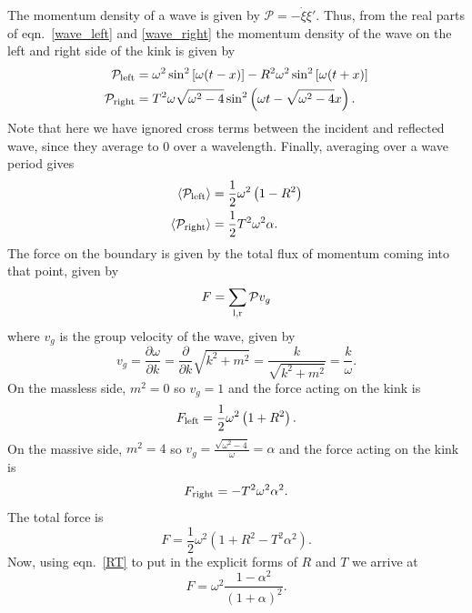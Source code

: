 \documentclass[11pt, oneside]{article}  	%
\numberwithin{equation}{section}
\begin{document}
The momentum density of a wave is given by $\mathcal{P} = -\dot{\xi}\xi'$. Thus, from the real parts of eqn.~\ref{wave_left} and \ref{wave_right} the momentum density of the wave on the left and right side of the kink is given by
\begin{align}
\mathcal{P}_\textup{left} &= \omega^2 \sin^2\left[\omega(t-x)\right] - R^2 \omega^2 \sin^2\left[\omega(t+x)\right]\\
\mathcal{P}_\textup{right} &= T^2 \omega \sqrt{\omega^2 - 4} \sin^2\left( \omega t - \sqrt{\omega^2 - 4} x\right ).
\end{align}
Note that here we have ignored cross terms between the incident and reflected wave, since they average to 0 over a wavelength. Finally, averaging over a wave period gives
\begin{align}
 \left \langle \mathcal{P}_\textup{left} \right \rangle &= \frac{1}{2}\omega^2 \left ( 1 - R^2 \right) \\
 \left \langle \mathcal{P}_\textup{right} \right \rangle &= \frac{1}{2}T^2 \omega^2 \alpha.
\end{align}
The force on the boundary is given by the total flux of momentum coming into that point, given by
\begin{equation}
F = \sum_\textup{l,r} \mathcal{P} v_g
\end{equation}
where $v_g$ is the group velocity of the wave, given by
\begin{equation}
v_g = \frac{\partial \omega}{\partial k} = \frac{\partial }{\partial k} \sqrt{k^2+m^2} = \frac{k}{\sqrt{k^2+m^2}} = \frac{k}{\omega}.
\end{equation}
On the massless side, $m^2 = 0$ so $v_g = 1$ and the force acting on the kink is
\begin{equation}
F_\textup{left} = \frac{1}{2}\omega^2 \left ( 1 + R^2 \right).
\end{equation}
On the massive side, $m^2 = 4$ so $v_g = \frac{\sqrt{\omega^2 - 4}}{\omega} = \alpha$ and the force acting on the kink is
\begin{equation}
F_\textup{right} = -T^2 \omega^2 \alpha^2.
\end{equation}
The total force is
\begin{equation}
F = \frac{1}{2}\omega^2 \left ( 1 + R^2-T^2\alpha^2\right).
\end{equation}
Now, using eqn.~\ref{RT} to put in the explicit forms of $R$ and $T$ we arrive at
\begin{equation}
F = \omega^2 \frac{1-\alpha^2}{\left (1+\alpha \right ) ^2}.
\end{equation}
\end{document}
